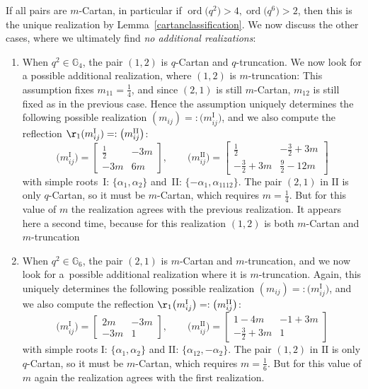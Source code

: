 \documentclass[10pt,a4paper]{amsart}
\numberwithin{equation}{section}
\begin{document}
If all pairs are $m$-Cartan, in particular if
$\operatorname{ord}\big(q^2\big)>4,\operatorname{ord}\big(q^6\big)>2$, then this is the unique realization by Lemma~\ref{cartanclassification}. We now discuss the other cases, where we ultimately find {\it no additional realizations}:
\begin{enumerate}\itemsep=0pt
	\item
When $q^2 \in \mathbb{G}_4$, the pair $(1,2)$ is $q$-Cartan and $q$-truncation. We now look for a possible additional realization, where $(1,2)$ is $m$-truncation: This assumption fixes $m_{11}=\frac{1}{4}$, and since $(2,1)$ is still $m$-Cartan, $m_{12}$ is still fixed as in the previous case. Hence the assumption uniquely determines the following possible realization $(m_{ij})=:\big(m_{ij}^\mathrm{I}\big)$, and we also compute the reflection $\r_1(m_{ij}^\mathrm{I})=:\big(m_{ij}^\mathrm{II}\big)$:
\[\big(m_{ij}^{\mathrm{I}}\big)= \begin{bmatrix}
 \frac{1}{2} & -3m\\
 -3m & 6m
\end{bmatrix}, \qquad \big(m_{ij}^{\mathrm{II}}\big)= \begin{bmatrix}
 \frac{1}{2} & -\frac{3}{2} + 3m\\
 -\frac{3}{2} + 3m & \frac{9}{2} -12m
\end{bmatrix} \]
with simple roots~I: $\lbrace\alpha_1, \alpha_2\rbrace$ and~II: $\lbrace -\alpha_{1}, \alpha_{1112}\rbrace$.
The pair $(2,1)$ in $\mathrm{II}$ is only $q$-Cartan, so it must be $m$-Cartan, which requires $m= \frac{1}{4}$. But for this value of $m$ the realization agrees with the previous realization. It appears here a second time, because for this realization $(1,2)$ is both $m$-Cartan and $m$-truncation

\item When $q^2\in \mathbb{G}_6$, the pair $(2,1)$ is $m$-Cartan and $m$-truncation, and we now look for a~possible additional realization where it is $m$-truncation. Again, this uniquely determines the following possible realization $(m_{ij})=:\big(m_{ij}^\mathrm{I}\big)$, and we also compute the reflection $\r_1\big(m_{ij}^\mathrm{I}\big)=:\big(m_{ij}^\mathrm{II}\big)$:
\[\big(m_{ij}^{\mathrm{I}}\big)= \begin{bmatrix}
 2m & -3m\\
 -3m & 1
\end{bmatrix}, \qquad \big(m_{ij}^{\mathrm{II}}\big)= \begin{bmatrix}
 1 - 4m & -1 + 3m\\
 -\frac{3}{2} + 3m & 1
\end{bmatrix} \]
with simple roots I: $\lbrace\alpha_1, \alpha_2\rbrace$ and II: $\lbrace \alpha_{12}, -\alpha_{2}\rbrace$. The pair $(1,2)$ in $\mathrm{II}$ is only $q$-Cartan, so it must be $m$-Cartan, which requires $m= \frac{1}{6}$. But for this value of $m$ again the realization agrees with the first realization.
\end{enumerate}
\end{document}
